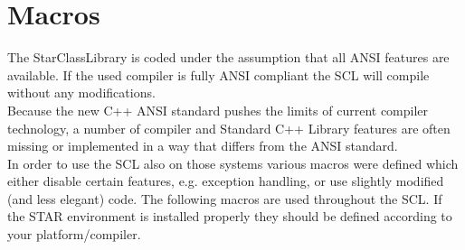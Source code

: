 \documentclass[twoside]{article}
\newcommand{\name}[1]{\textsf{#1}}%
\begin{document}
\section{Macros}  \label{Macros}

The \name{StarClassLibrary} is coded under the assumption that all
ANSI features are available. If the used compiler is fully ANSI
compliant the SCL will compile without any modifications.\\
Because the new C++ ANSI standard pushes the limits of current  
compiler technology, a number of compiler and Standard C++ Library 
features are often missing or implemented in a way that differs from
the ANSI standard.\\
In order to use the SCL also on those systems various macros were defined
which either disable certain features, e.g. exception handling, or use
slightly modified (and less elegant) code.
The following macros are used throughout the SCL.
If the STAR environment is installed properly they should be defined
according to your platform/compiler. 
\end{document}
